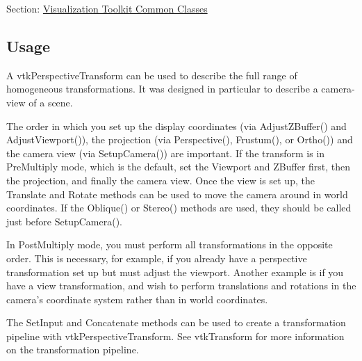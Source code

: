 Section\-: \hyperlink{sec_vtkcommon}{Visualization Toolkit Common Classes} \hypertarget{vtkwidgets_vtkxyplotwidget_Usage}{}\subsection{Usage}\label{vtkwidgets_vtkxyplotwidget_Usage}
A vtk\-Perspective\-Transform can be used to describe the full range of homogeneous transformations. It was designed in particular to describe a camera-\/view of a scene. 

The order in which you set up the display coordinates (via Adjust\-Z\-Buffer() and Adjust\-Viewport()), the projection (via Perspective(), Frustum(), or Ortho()) and the camera view (via Setup\-Camera()) are important. If the transform is in Pre\-Multiply mode, which is the default, set the Viewport and Z\-Buffer first, then the projection, and finally the camera view. Once the view is set up, the Translate and Rotate methods can be used to move the camera around in world coordinates. If the Oblique() or Stereo() methods are used, they should be called just before Setup\-Camera(). 

In Post\-Multiply mode, you must perform all transformations in the opposite order. This is necessary, for example, if you already have a perspective transformation set up but must adjust the viewport. Another example is if you have a view transformation, and wish to perform translations and rotations in the camera's coordinate system rather than in world coordinates. 

The Set\-Input and Concatenate methods can be used to create a transformation pipeline with vtk\-Perspective\-Transform. See vtk\-Transform for more information on the transformation pipeline.

